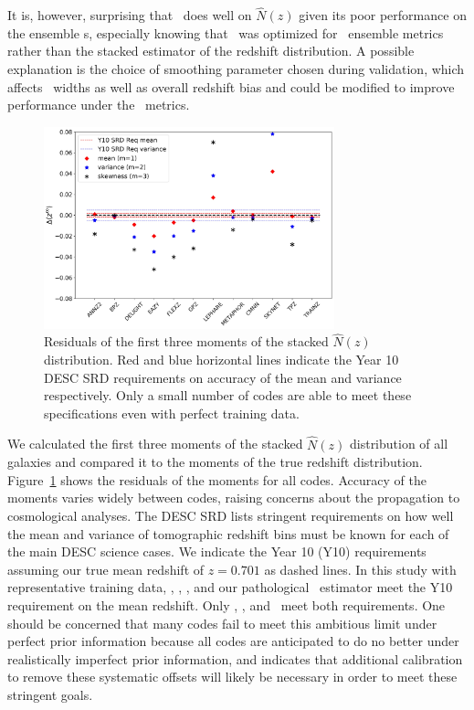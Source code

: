 It is, however, surprising that \tpz\ does well on $\hat{N}(z)$ given its poor performance on the ensemble \pzpdf s, especially knowing that \tpz\ was optimized for \pzpdf\ ensemble metrics rather than the stacked estimator of the redshift distribution.
A possible explanation is the choice of smoothing parameter chosen during validation, which affects \pzpdf\ widths as well as overall redshift bias and could be modified to improve performance under the \pzpdf\ metrics.

\begin{figure}
\centering
\includegraphics[width=0.75\textwidth]{fig/momentsplot_10yr.jpg}
\caption{Residuals of the first three moments of the stacked $\hat{N}(z)$ distribution.  Red and blue horizontal lines indicate the Year 10 DESC SRD requirements on accuracy of the mean and variance respectively.  Only a small number of codes are able to meet these specifications even with perfect training data.   }
\label{fig:moments}
\end{figure}


We calculated the first three moments of the stacked $\hat{N}(z)$ distribution of all galaxies and compared it to the moments of the true redshift distribution.  Figure~\ref{fig:moments} shows the residuals of the moments for all codes.  Accuracy of the moments varies widely between codes, raising concerns about the propagation to cosmological analyses.  The DESC SRD \citep{Mandelbaum:2018} lists stringent requirements on how well the mean and variance of tomographic redshift bins must be known for each of the main DESC science cases.  We indicate the Year 10 (Y10) requirements assuming our true mean redshift of $z=0.701$ as dashed lines.  In this study with representative training data, \annz, \cmnn, \tpz, and our pathological \trainz\ estimator meet the Y10 requirement on the mean redshift.  Only \annz, \cmnn, and \trainz\ meet both requirements.  One should be concerned that many codes fail to meet this ambitious limit under perfect prior information because all codes are anticipated to do no better under realistically imperfect prior information, and indicates that additional calibration to remove these systematic offsets \citep[e.~g.~][]{Newman:2008} will likely be necessary in order to meet these stringent goals.


